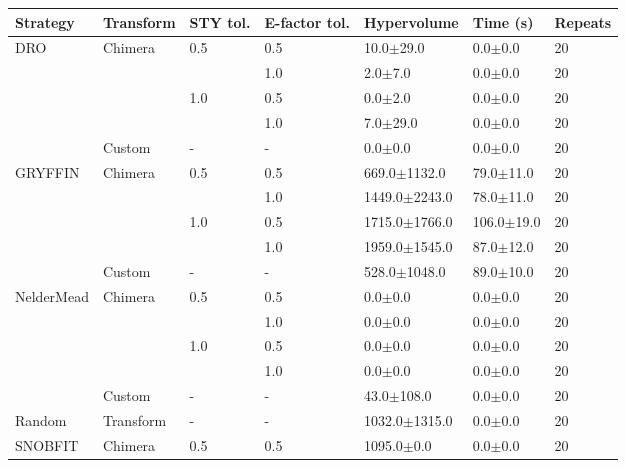 \begin{table}[]
    \centering
    \begin{tabular}{lllllll}
        \textbf{Strategy} & \textbf{Transform} & \textbf{STY tol.} & \textbf{E-factor tol. }& \textbf{Hypervolume} & \textbf{Time (s) }  & \textbf{Repeats}                \\
        \hline
        DRO & Chimera & 0.5 & 0.5 &        10.0$\pm$29.0 &        0.0$\pm$0.0 &       20 \\
              &           &     & 1.0 &          2.0$\pm$7.0 &        0.0$\pm$0.0 &       20 \\
              &           & 1.0 & 0.5 &          0.0$\pm$2.0 &        0.0$\pm$0.0 &       20 \\
              &           &     & 1.0 &         7.0$\pm$29.0 &        0.0$\pm$0.0 &       20 \\
              & Custom & - & - &          0.0$\pm$0.0 &        0.0$\pm$0.0 &       20 \\
        GRYFFIN & Chimera & 0.5 & 0.5 &     669.0$\pm$1132.0 &      79.0$\pm$11.0 &       20 \\
              &           &     & 1.0 &    1449.0$\pm$2243.0 &      78.0$\pm$11.0 &       20 \\
              &           & 1.0 & 0.5 &    1715.0$\pm$1766.0 &     106.0$\pm$19.0 &       20 \\
              &           &     & 1.0 &    1959.0$\pm$1545.0 &      87.0$\pm$12.0 &       20 \\
              & Custom & - & - &     528.0$\pm$1048.0 &      89.0$\pm$10.0 &       20 \\
        NelderMead & Chimera & 0.5 & 0.5 &          0.0$\pm$0.0 &        0.0$\pm$0.0 &       20 \\
              &           &     & 1.0 &          0.0$\pm$0.0 &        0.0$\pm$0.0 &       20 \\
              &           & 1.0 & 0.5 &          0.0$\pm$0.0 &        0.0$\pm$0.0 &       20 \\
              &           &     & 1.0 &          0.0$\pm$0.0 &        0.0$\pm$0.0 &       20 \\
              & Custom & - & - &       43.0$\pm$108.0 &        0.0$\pm$0.0 &       20 \\
        Random & Transform & - & - &    1032.0$\pm$1315.0 &        0.0$\pm$0.0 &       20 \\
        SNOBFIT & Chimera & 0.5 & 0.5 &       1095.0$\pm$0.0 &        0.0$\pm$0.0 &       20 \\

\end{tabular}
\end{table}
